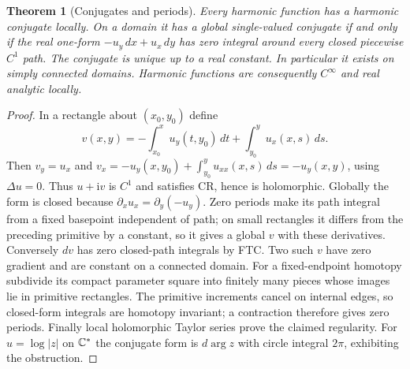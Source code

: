 \documentclass[11pt,a4paper,openany]{book}
\newtheorem{theorem}{Theorem}[chapter]
\theoremstyle{definition}
\theoremstyle{remark}\newtheorem{remark}[theorem]{Remark}
\newcommand{\dd}{\,d}\newcommand{\iu}{\mathrm i}
\newcommand{\family}[1]{}
\begin{document}
\begin{theorem}[Conjugates and periods]\family{D12.13.02}\label{d12:13-02}
Every harmonic function has a harmonic conjugate locally. On a domain it has a global single-valued conjugate if and only if the real one-form $-u_y\,dx+u_x\,dy$ has zero integral around every closed piecewise $C^1$ path. The conjugate is unique up to a real constant. In particular it exists on simply connected domains. Harmonic functions are consequently $C^\infty$ and real analytic locally.
\end{theorem}
\begin{proof}
In a rectangle about $(x_0,y_0)$ define
\[
 v(x,y)=-\int_{x_0}^x u_y(t,y_0)\dd t+\int_{y_0}^y u_x(x,s)\dd s.
\]
Then $v_y=u_x$ and $v_x=-u_y(x,y_0)+\int_{y_0}^y u_{xx}(x,s)\dd s=-u_y(x,y)$, using $\Delta u=0$. Thus $u+\iu v$ is $C^1$ and satisfies CR, hence is holomorphic. Globally the form is closed because $\partial_xu_x=\partial_y(-u_y)$. Zero periods make its path integral from a fixed basepoint independent of path; on small rectangles it differs from the preceding primitive by a constant, so it gives a global $v$ with these derivatives. Conversely $dv$ has zero closed-path integrals by FTC. Two such $v$ have zero gradient and are constant on a connected domain. For a fixed-endpoint homotopy subdivide its compact parameter square into finitely many pieces whose images lie in primitive rectangles. The primitive increments cancel on internal edges, so closed-form integrals are homotopy invariant; a contraction therefore gives zero periods. Finally local holomorphic Taylor series prove the claimed regularity. For $u=\log|z|$ on $\mathbb C^*$ the conjugate form is $d\arg z$ with circle integral $2\pi$, exhibiting the obstruction.
\end{proof}
\end{document}
